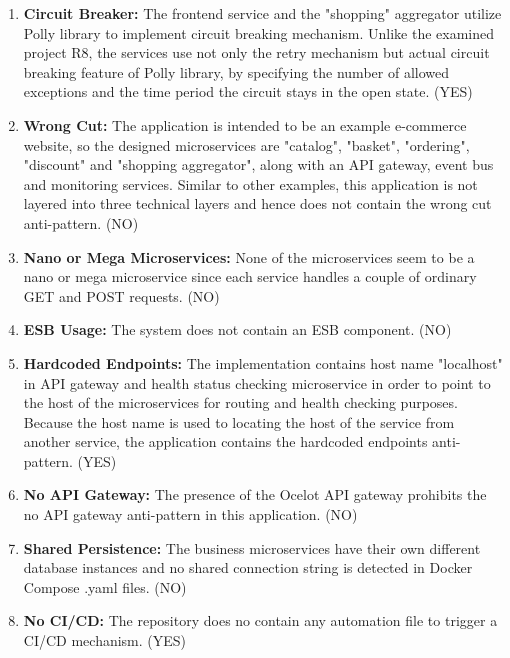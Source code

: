\documentclass{Configuration_Files/PoliMi3i_thesis}
\begin{document}
\begin{enumerate}
    \item \textbf{Circuit Breaker:} The frontend service and the "shopping" aggregator utilize Polly library to implement circuit breaking mechanism.
    Unlike the examined project R8, the services use not only the retry mechanism but actual circuit breaking feature of Polly library, by specifying the number of allowed exceptions and the time period the circuit stays in the open state. (YES)
    
    \item \textbf{Wrong Cut:} The application is intended to be an example e-commerce website, so the designed microservices are "catalog", "basket", "ordering", "discount" and "shopping aggregator", along with an API gateway, event bus and monitoring services.
    Similar to other examples, this application is not layered into three technical layers and hence does not contain the wrong cut anti-pattern. (NO)
    
    \item \textbf{Nano or Mega Microservices:} None of the microservices seem to be a nano or mega microservice since each service handles a couple of ordinary GET and POST requests. (NO)
    
    \item \textbf{ESB Usage:} The system does not contain an ESB component. (NO)
    
    \item \textbf{Hardcoded Endpoints:} The implementation contains host name "localhost" in API gateway and health status checking microservice in order to point to the host of the microservices for routing and health checking purposes.
    Because the host name is used to locating the host of the service from another service, the application contains the hardcoded endpoints anti-pattern. (YES)
    
    \item \textbf{No API Gateway:} The presence of the Ocelot API gateway prohibits the no API gateway anti-pattern in this application. (NO)
    
    \item \textbf{Shared Persistence:} The business microservices have their own different database instances and no shared connection string is detected in Docker Compose .yaml files. (NO)
    
    \item \textbf{No CI/CD:} The repository does no contain any automation file to trigger a CI/CD mechanism. (YES)
    

\end{enumerate}
\end{document}

